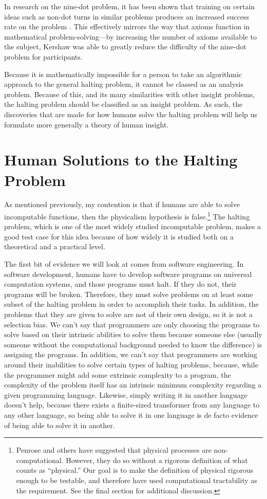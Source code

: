In research on the nine-dot problem, it has been shown that training on certain ideas such as non-dot turns in similar problems produces an increased success rate on the problem \citep{kershawandohlsson2001, kershaw2004}.  This effectively mirrors the way that axioms function in mathematical problem-solving---by increasing the number of axioms available to the subject, Kershaw was able to greatly reduce the difficulty of the nine-dot problem for participants.

Because it is mathematically impossible for a person to take an algorithmic approach to the general halting problem, it cannot be classed as an analysis problem.  Because of this, and its many similarities with other insight problems, the halting problem should be classified as an insight problem.  As such, the discoveries that are made for how humans solve the halting problem will help us formulate more generally a theory of human insight.

\section{Human Solutions to the Halting Problem}

As mentioned previously, my contention is that if humans are able to solve incomputable functions, then the physicalism hypothesis is false.\footnote{Penrose and others have suggested that physical processes are non-computational.  However, they do so without a rigorous definition of what counts as ``physical.''  Our goal is to make the definition of physical rigorous enough to be testable, and therefore have used computational tractability as the requirement.  See the final section for additional discussion.}  The halting problem, which is one of the most widely studied incomputable problem, makes a good test case for this idea because of how widely it is studied both on a theoretical and a practical level.

The first bit of evidence we will look at comes from software engineering.  In software development, humans have to develop software programs on universal computation systems, and those programs must halt.  If they do not, their programs will be broken.  Therefore, they must solve problems on at least some subset of the halting problem in order to accomplish their tasks.  In addition, the problems that they are given to solve are not of their own design, so it is not a selection bias.  We can't say that programmers are only choosing the programs to solve based on their intrinsic abilities to solve them because someone else (usually someone without the computational background needed to know the difference) is assigning the programs.  In addition, we can't say that programmers are working around their inabilities to solve certain types of halting problems, because, while the programmer might add some extrinsic complexity to a program, the complexity of the problem itself has an intrinsic minimum complexity regarding a given programming language.  Likewise, simply writing it in another language doesn't help, because there exists a finite-sized transformer from any language to any other language, so being able to solve it in one language is de facto evidence of being able to solve it in another.

